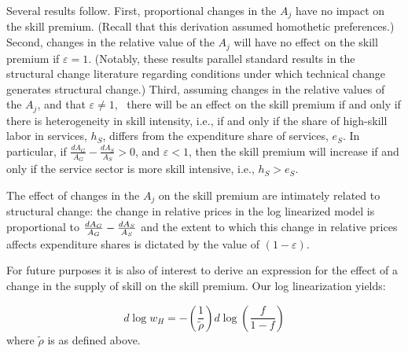 \documentclass[12pt,english]{article}
\begin{document}
{\normalsize Several results follow. First, proportional changes in the $%
A_{j}$ have no impact on the skill premium. (Recall that this derivation
assumed homothetic preferences.) Second, changes in the relative value of
the $A_{j}$ will have no effect on the skill premium if $\varepsilon =1$.
(Notably, these results parallel standard results in the structural change
literature regarding conditions under which technical change generates
structural change.) Third, assuming changes in the relative values of the $%
A_{j}$, and that $\varepsilon \not=1$, \ there will be an effect on the
skill premium if and only if there is heterogeneity in skill intensity,
i.e., if and only if the share of high-skill labor in services, $h_{S}$,
differs from the expenditure share of services, $e_{S}$. In particular, if $%
\frac{dA_{G}}{A_{G}}-\frac{dA_{S}}{A_{S}}>0$, and $\varepsilon <1$, then the
skill premium will increase if and only if the service sector is more skill
intensive, i.e., $h_{S}>e_{S}$. }

{\normalsize The effect of changes in the $A_{j}$ on the skill premium are
intimately related to structural change: the change in relative prices in
the log linearized model is proportional to $\frac{dA_{G}}{A_{G}}-\frac{%
dA_{S}}{A_{S}}$ and the extent to which this change in relative prices
affects expenditure shares is dictated by the value of $(1-\varepsilon )$. }

{\normalsize For future purposes it is also of interest to derive an
expression for the effect of a change in the supply of skill on the skill
premium. Our log linearization yields: }

{\normalsize 
\begin{equation}
d\log{w_{H}}=-\left(\frac{1}{\tilde{\rho}}\right)d\log{\left(\frac{f}{1-f}%
\right)}  \label{effectiverho}
\end{equation}%
where $\tilde{\rho}$ is as defined above. }
\end{document}
